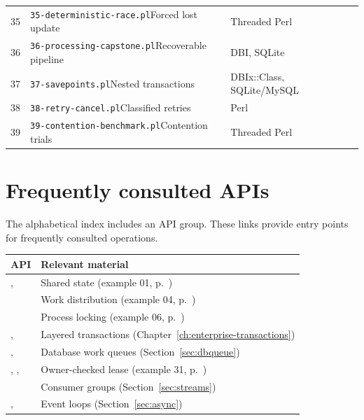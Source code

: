 \begin{longtable}{L{.06\linewidth}L{.41\linewidth}L{.31\linewidth}L{.08\linewidth}}
35 & \nolinkurl{35-deterministic-race.pl}\newline Forced lost update & Threaded Perl & \pageref{listing:examples/35-deterministic-race.pl}\\
36 & \nolinkurl{36-processing-capstone.pl}\newline Recoverable pipeline & DBI, SQLite & \pageref{listing:examples/36-processing-capstone.pl}\\
37 & \nolinkurl{37-savepoints.pl}\newline Nested transactions & DBIx::Class, SQLite/MySQL & \pageref{listing:examples/37-savepoints.pl}\\
38 & \nolinkurl{38-retry-cancel.pl}\newline Classified retries & Perl & \pageref{listing:examples/38-retry-cancel.pl}\\
39 & \nolinkurl{39-contention-benchmark.pl}\newline Contention trials & Threaded Perl & \pageref{listing:examples/39-contention-benchmark.pl}\\
\bottomrule
\end{longtable}
\section{Frequently consulted APIs}
The alphabetical index includes an API group. These links provide
entry points for frequently consulted operations.
\begin{longtable}{L{.32\linewidth}L{.59\linewidth}}
\toprule API & Relevant material\\ \midrule\endhead
{},  & Shared state (example 01, p.~\pageref{listing:examples/01-mutex.pl})\\
 & Work distribution (example 04, p.~\pageref{listing:examples/04-queue.pl})\\
 & Process locking (example 06, p.~\pageref{listing:examples/06-flock.pl})\\
,  & Layered transactions (Chapter~\ref{ch:enterprise-transactions})\\
,  & Database work queues (Section~\ref{sec:dbqueue})\\
, ,  & Owner-checked lease (example 31, p.~\pageref{listing:examples/31-redis-watch-lease.pl})\\
 & Consumer groups (Section~\ref{sec:streams})\\
,  & Event loops (Section~\ref{sec:async})\\
\bottomrule
\end{longtable}
